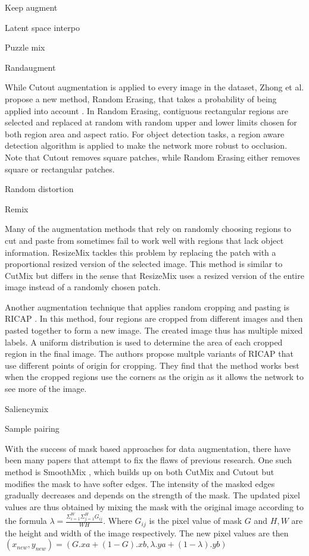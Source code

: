 Keep augment

Latent space interpo

Puzzle mix

Randaugment

While Cutout augmentation \cite{devriesImprovedRegularizationConvolutional2017} is applied to every image in the dataset, Zhong et al. propose a new method, Random Erasing, that takes a probability of being applied into account \cite{zhongRandomErasingData2020}. In Random Erasing, contiguous rectangular regions are selected and replaced at random with random upper and lower limits chosen for both region area and aspect ratio. For object detection tasks, a region aware detection algorithm is applied to make the network more robust to occlusion. Note that Cutout removes square patches, while Random Erasing either removes square or rectangular patches. 

Random distortion

Remix

Many of the augmentation methods that rely on randomly choosing regions to cut and paste from sometimes fail to work well with regions that lack object information. ResizeMix \cite{qinResizeMixMixingData2020} tackles this problem by replacing the patch with a proportional resized version of the selected image. This method is similar to CutMix \cite{yunCutMixRegularizationStrategy2019} but differs in the sense that ResizeMix uses a resized version of the entire image instead of a randomly chosen patch.

Another augmentation technique that applies random cropping and pasting is RICAP \cite{takahashiDataAugmentationUsing2020}. In this method, four regions are cropped from different images and then pasted together to form a new image. The created image thus has multiple mixed labels. A uniform distribution is used to determine the area of each cropped region in the final image. The authors propose multple variants of RICAP that use different points of origin for cropping. They find that the method works best when the cropped regions use the corners as the origin as it allows the network to see more of the image.

Saliencymix

Sample pairing

With the success of mask based approaches for data augmentation, there have been many papers that attempt to fix the flaws of previous research. One such method is SmoothMix \cite{leeSmoothMixSimpleEffective2020}, which builds up on both CutMix \cite{yunCutMixRegularizationStrategy2019} and Cutout \cite{devriesImprovedRegularizationConvolutional2017} but modifies the mask to have softer edges. The intensity of the masked edges gradually decreases and depends on the strength of the mask. The updated pixel values are thus obtained by mixing the mask with the original image according to the formula $\lambda= \frac{\Sigma_{i=1}^{W}\Sigma_{j=1}^{H}G_{ij}}{WH}$. Where $G_{ij}$ is the pixel value of mask $G$ and $H,W$ are the height and width of the image respectively. The new pixel values are then $(x_{new} , y_{new}) = (G.xa + (1 - G).xb , \lambda.ya + (1 - \lambda).yb)$


